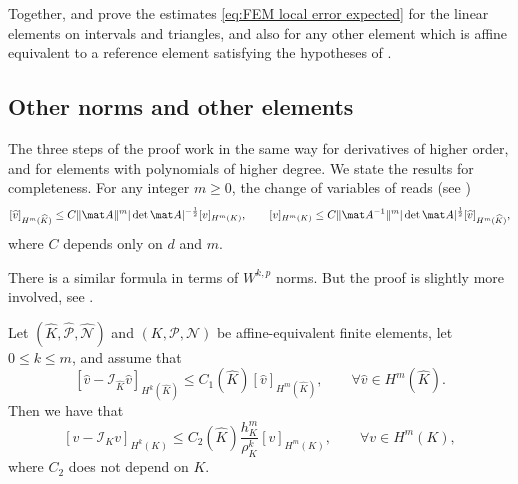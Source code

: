 Together,  and  prove the estimates \eqref{eq:FEM local error expected} for the linear elements on intervals and triangles, and also for any other element which is affine equivalent to a reference element satisfying the hypotheses of .

\subsection{Other norms and other elements}

The three steps of the proof work in the same way for derivatives of higher order, and for elements with polynomials of higher degree.
We state the results for completeness.
For any integer $m \ge 0$, the change of variables of  reads (see \cite[Proposition 3.4.1 and 3.4.2]{QuarteroniValli1994})
\begin{equation}
    \label{eq:FEM affine equivalence Hm norm general}
    [\widehat v ]_{H^m (\widehat K)} \le C \|\mat A\|^m |\det \mat A|^{-\frac 1 2} [v]_{H^m (K)},
    \qquad
    [v ]_{H^m (K)} \le C \|\mat A^{-1}\|^m |\det \mat A|^{\frac 1 2} [\widehat v]_{H^m (\widehat K)},
\end{equation}
where $C$ depends only on $d$ and $m$.
\begin{remark}
    There is a similar formula in terms of $W^{k,p}$ norms. But the proof is slightly more involved, see \cite[Section 3.3]{Suli}.
\end{remark}

\begin{theorem}
    \label{thm:FEM affine equivalence and interpolation estimate}
    Let $(\widehat K, \widehat{\mathcal P}, \widehat{\mathcal N})$ and $(K, \mathcal P, \mathcal N)$ be affine-equivalent finite elements, let $0 \le k \le m$, and assume that
    \begin{equation*}
        \left[ \widehat v - \mathcal I_{\widehat K} \widehat v \right]_{H^k(\widehat K)} \le C_1(\widehat K) [\widehat v]_{H^m (\widehat K)}, \qquad \forall \widehat v \in H^m(\widehat K).
    \end{equation*}
    Then we have that
    \begin{equation*}
        \left[v - \mathcal I_{K} v \right]_{H^k(K)} \le C_2(\widehat K) \frac{h_{K}^{m}}{\rho_{K}^k} [v]_{H^m (K)}, \qquad \forall v \in H^m(K),
    \end{equation*}
    where $C_2$ does not depend on $K$.
\end{theorem}

